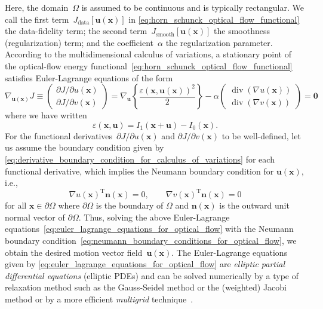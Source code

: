 \documentclass[12pt,a4paper]{article}
\begin{document}
Here, the domain~$\Omega$ is assumed to be continuous and is typically rectangular.
We call the first term~$J_{\text{data}}[\mathbf{u}(\mathbf{x})]$ in
\eqref{eq:horn_schunck_optical_flow_functional} the data-fidelity term;
the second term~$J_{\text{smooth}}[\mathbf{u}(\mathbf{x})]$ the smoothness (regularization) term;
and the coefficient~$\alpha$ the regularization parameter.
According to the multidimensional calculus of variations, a stationary point of
the optical-flow energy functional~\eqref{eq:horn_schunck_optical_flow_functional} satisfies
Euler-Lagrange equations of the form
\begin{equation}
\nabla_{\mathbf{u}(\mathbf{x})} J
\equiv
\begin{pmatrix}
\partial J / \partial u(\mathbf{x}) \\
\partial J / \partial v(\mathbf{x})
\end{pmatrix}
=
\nabla_{\mathbf{u}} \left\{
\frac{ {\varepsilon\left(\mathbf{x}, \mathbf{u}(\mathbf{x})\right)}^{2} }{2}
\right\}
- \alpha
\begin{pmatrix}
\operatorname{div}\left(\nabla u(\mathbf{x})\right) \\
\operatorname{div}\left(\nabla v(\mathbf{x})\right)
\end{pmatrix}
=
\mathbf{0}
\label{eq:euler_lagrange_equations_for_optical_flow}
\end{equation}
where we have written
\begin{equation}
\varepsilon\left(\mathbf{x}, \mathbf{u}\right) = I_1(\mathbf{x} + \mathbf{u}) - I_0(\mathbf{x}).
\end{equation}
For the functional derivatives~$\partial J / \partial u(\mathbf{x})$ and
$\partial J / \partial v(\mathbf{x})$ to be well-defined,
let us assume the boundary condition given by
\eqref{eq:derivative_boundary_condition_for_calculus_of_variations} for each functional derivative,
which implies the Neumann boundary condition for $\mathbf{u}(\mathbf{x})$, i.e.,
\begin{equation}
{\nabla u(\mathbf{x})}^{\operatorname{T}} \mathbf{n}(\mathbf{x}) = 0, \qquad
{\nabla v(\mathbf{x})}^{\operatorname{T}} \mathbf{n}(\mathbf{x}) = 0
\label{eq:neumann_boundary_conditions_for_optical_flow}
\end{equation}
for all $\mathbf{x} \in \partial\Omega$
where $\partial\Omega$ is the boundary of $\Omega$ and
$\mathbf{n}(\mathbf{x})$ is the outward unit normal vector of $\partial\Omega$.
Thus, solving the above Euler-Lagrange
equations~\eqref{eq:euler_lagrange_equations_for_optical_flow}
with the Neumann boundary condition~\eqref{eq:neumann_boundary_conditions_for_optical_flow},
we obtain the desired motion vector field~$\mathbf{u}(\mathbf{x})$.
The Euler-Lagrange equations given by \eqref{eq:euler_lagrange_equations_for_optical_flow} are
\emph{elliptic partial differential equations} (elliptic PDEs) and can be solved numerically by
a type of relaxation method such as the Gauss-Seidel method or the (weighted) Jacobi method or
by a more efficient \emph{multigrid} technique~\citep{Press:NR,Briggs:MultigridTutorial}.
\end{document}
